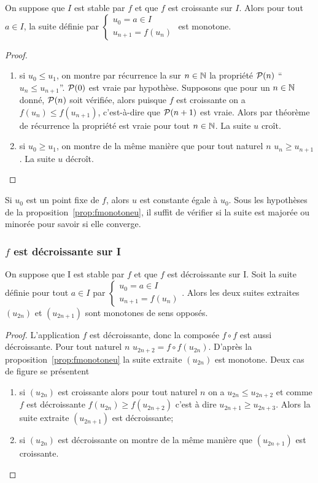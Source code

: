 \begin{prop}\label{prop:fmonotoneu}
  On suppose que $I$ est stable par $f$ et que $f$ est croissante sur $I$. Alors pour tout $a \in I$, la suite définie par $\begin{cases} u_0=a \in I \\ u_{n+1}=f(u_n) \end{cases}$ est monotone.
\end{prop}
\begin{proof}
  \begin{enumerate}
  \item si $u_0 \leqslant u_1$, on montre par récurrence la sur $n \in \N$ la propriété $\P(n)$ ``$u_n \leqslant u_{n+1}$''. $\P(0)$ est vraie par hypothèse. Supposons que pour un $n \in \N$ donné, $\P(n)$ soit vérifiée, alors puisque $f$ est croissante on a $f(u_n) \leqslant f(u_{n+1})$, c'est-à-dire que $\P(n+1)$ est vraie. Alors par théorème de récurrence la propriété est vraie pour tout $n \in \N$. La suite $u$ croît.
  \item si $u_0 \geqslant u_1$, on montre de la même manière que pour tout naturel $n$ $u_n \geqslant u_{n+1}$. La suite $u$ décroît.
  \end{enumerate}
\end{proof}

Si $u_0$ est un point fixe de $f$, alors $u$ est constante égale à $u_0$. Sous les hypothèses de la proposition~\ref{prop:fmonotoneu}, il suffit de vérifier si la suite est majorée ou minorée pour savoir si elle converge.

\subsubsection{$f$ est décroissante sur I}

\begin{prop}
  On suppose que I est stable par $f$ et que $f$ est décroissante sur I. Soit la suite définie pour tout $a \in I$ par $\begin{cases} u_0=a \in I \\ u_{n+1}=f(u_n) \end{cases}$. Alors les deux suites extraites $(u_{2n})$ et $(u_{2n+1})$ sont monotones de sens opposés.
\end{prop}
\begin{proof}
  L'application $f$ est décroissante, donc la composée $f \circ f$ est aussi décroissante. Pour tout naturel $n$ $u_{2n+2}=f \circ f(u_{2n})$. D'après la proposition~\ref{prop:fmonotoneu} la suite extraite $(u_{2n})$ est monotone. Deux cas de figure se présentent
  \begin{enumerate}
  \item si $(u_{2n})$ est croissante alors pour tout naturel $n$ on a $u_{2n} \leqslant u_{2n+2}$ et comme $f$ est décroissante $f(u_{2n}) \geqslant f(u_{2n+2})$ c'est à dire $u_{2n+1} \geqslant u_{2n+3}$. Alors la suite extraite $(u_{2n+1})$ est décroissante;
  \item si $(u_{2n})$ est décroissante on montre de la même manière que $(u_{2n+1})$ est croissante.
    \end{enumerate}
\end{proof}

